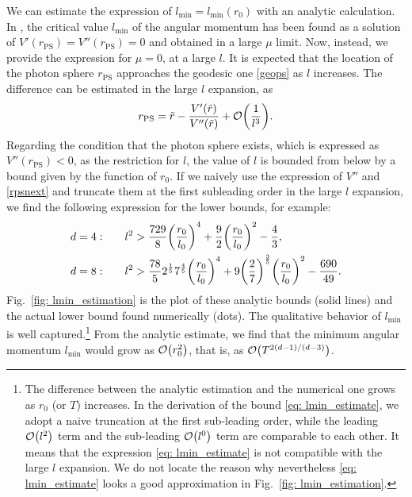 \documentclass[a4paper,11pt]{article}
\begin{document}
We can estimate the expression of $l_\mathrm{min}=l_\mathrm{min}(r_0)$ with an analytic calculation. In \cite{Festuccia:2008zx}, the critical value $l_\mathrm{min}$ of the angular momentum has been found as a solution of $V'(r_\mathrm{PS})=V''(r_\mathrm{PS})=0$ and obtained in a large $\mu$ limit. Now, instead, we provide the expression for $\mu=0$, at a large $l$.
It is expected that the location of the photon sphere $r_\mathrm{PS}$ approaches the geodesic one \eqref{geops} as $l$ increases. The difference can be estimated in the large $l$ expansion, as
\begin{align}
    r_\mathrm{PS} = 
    \tilde{r}
    -\frac{V'(\tilde{r})}{V''(\tilde{r})}+\order{\frac{1}{l^3}}.
    \label{rpsnext}
\end{align}
Regarding the condition that the photon sphere exists, which is expressed as $V''(r_\mathrm{PS})<0$, as the restriction for $l$, the value of $l$ is bounded from below by a bound given by the function of $r_0$.
If we naively use the expression of $V''$ and \eqref{rpsnext} and truncate them at the first subleading order in the large $l$ expansion, we find the following expression for the lower bounds, for example:
\begin{align}
    \begin{aligned}
        d=4:&\qquad l^2>\frac{729}{8}\qty(\frac{r_0}{l_0})^4+\frac{9}{2}\qty(\frac{r_0}{l_0})^2-\frac{4}{3},\\
        d=8:&\qquad l^2>\frac{78}{5}2^{\frac{1}{5}}7^{\frac{4}{5}}\qty(\frac{r_0}{l_0})^4+9\qty(\frac{2}{7})^{\frac{3}{5}}\qty(\frac{r_0}{l_0})^2-\frac{690}{49}.
    \end{aligned}
        \label{eq: lmin_estimate}
\end{align}
Fig.~\ref{fig: lmin_estimation} is the plot of these analytic bounds (solid lines) and the actual lower bound found numerically (dots). The qualitative behavior of $l_\mathrm{min}$ is well captured.\footnote{The difference between the analytic estimation and the numerical one grows as $r_0$ (or $T$) increases.
In the derivation of the bound \eqref{eq: lmin_estimate}, we adopt a naive truncation at the first sub-leading order, while %
the leading $\order{l^2}$ term and the sub-leading $\order{l^0}$ term are comparable to each other. It means that the expression \eqref{eq: lmin_estimate} is not compatible with the large $l$ expansion. We do not locate the reason why nevertheless \eqref{eq: lmin_estimate} looks a good approximation in Fig.~\ref{fig: lmin_estimation}.
}
From the analytic estimate,
we find that the minimum angular momentum $l_\mathrm{min}$ would grow as $\order{r_0^2}$, that is, as $\order{T^{2(d-1)/(d-3)}}$.
\end{document}
